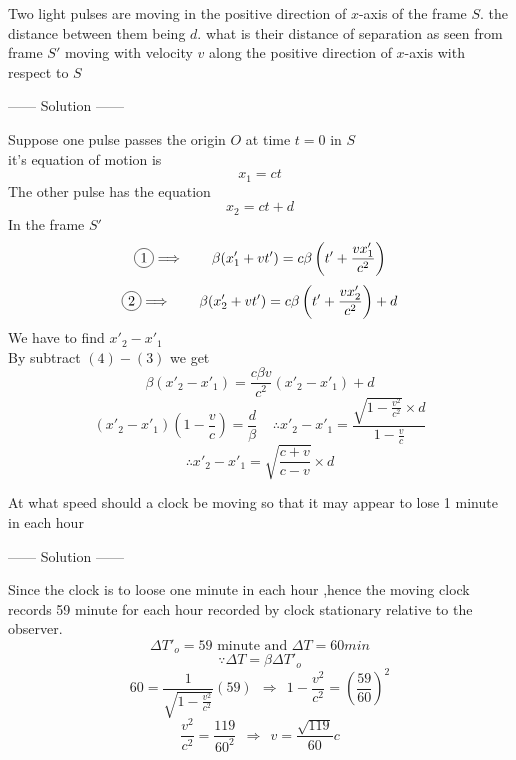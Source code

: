 \begin{example}
    Two light pulses are moving in the positive direction of $x$-axis of the frame $S$. the distance between them being $d$. what is their distance of separation as seen from frame $S'$ moving with velocity $v$ along the positive direction of $x$-axis with respect to $S$
    \begin{center}
        ------ \textcolor{Solution}{Solution} ------
    \end{center}
    Suppose one pulse passes the origin $O$ at time $t=0$ in $S$\\
    it's equation of motion is 
    \setcounter{equation}{0}
    \begin{equation}
        x_1=ct
    \end{equation}
    The other pulse has the equation
    \begin{equation}
        x_2=ct+d
    \end{equation}
    In the frame $S'$
    \begin{equation}
    \circled{1}  \Longrightarrow  \ \ \ \ \ \ \beta(x'_1+vt') = c\beta\left(t'+\frac{vx'_1}{c^2}\right)
    \end{equation}
    \begin{equation}
        \circled{2}  \Longrightarrow  \ \ \ \ \ \ \beta(x'_2+vt') = c\beta\left(t'+\frac{vx'_2}{c^2}\right) + d
    \end{equation}
    We have to find $x'_2-x'_1$\\
    By subtract $(4)-(3)$ we get
    \[
    \beta(x'_2-x'_1)=\frac{c\beta v}{c^2}(x'_2-x'_1) + d
    \]
    \[
    (x'_2-x'_1)(1-\frac{v}{c})=\frac{d}{\beta} \ \ \ \ \ \therefore x'_2-x'_1 = \frac{\sqrt{1-\frac{v^2}{c^2}} \times d}{1-\frac{v}{c}}
    \]
    \[
    \therefore x'_2-x'_1 = \sqrt{\frac{c+v}{c-v}} \times d
    \]
\end{example}
\newpage
\begin{example}
    At what speed should a clock be moving so that it may appear to lose 1 minute in each hour
\begin{center}
    ------ \textcolor{Solution}{Solution} ------
\end{center}
    Since the clock is to loose one minute in each hour ,hence the moving clock records 59 minute for each hour recorded by clock stationary relative to the observer.\\
    \[
    \Delta T'_o = 59\text{ minute \ \ \ \ and\ \ }\Delta T=60 \si{min}
    \]
    \[
    \because \Delta T = \beta\Delta T'_o 
    \]
    \[
    60 = \frac{1}{\sqrt{1-\frac{v^2}{c^2}}}(59) \ \ \Longrightarrow \ \  1-\frac{v^2}{c^2} = {\left(\frac{59}{60}\right)}^2
    \]
    \[
    \frac{v^2}{c^2} = \frac{119}{60^2} \ \ \Longrightarrow \ \ v=\frac{\sqrt{119}}{60}c
    \]
\end{example}
